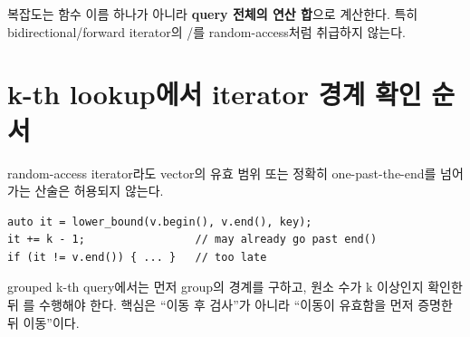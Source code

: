 복잡도는 함수 이름 하나가 아니라 \textbf{query 전체의 연산 합}으로 계산한다. 특히 bidirectional/forward iterator의 /를 random-access처럼 취급하지 않는다.

\section{k-th lookup에서 iterator 경계 확인 순서}

random-access iterator라도 vector의 유효 범위 또는 정확히 one-past-the-end를 넘어가는 산술은 허용되지 않는다.

\begin{lstlisting}
auto it = lower_bound(v.begin(), v.end(), key);
it += k - 1;                 // may already go past end()
if (it != v.end()) { ... }   // too late
\end{lstlisting}

grouped k-th query에서는 먼저 group의 \code{[begin,end)} 경계를 구하고, 원소 수가 k 이상인지 확인한 뒤 를 수행해야 한다. 핵심은 ``이동 후 검사''가 아니라 ``이동이 유효함을 먼저 증명한 뒤 이동''이다.
